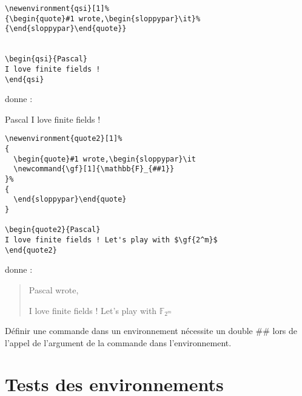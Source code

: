 \newenvironment{quote2}[1]%
{
  \begin{quote}#1 wrote,\begin{sloppypar}\it
  \newcommand{\gf}[1]{\mathbb{F}_{##1}}
}%
{
  \end{sloppypar}\end{quote}
}


\bigskip
\begin{verbatim}
\newenvironment{qsi}[1]%
{\begin{quote}#1 wrote,\begin{sloppypar}\it}%
{\end{sloppypar}\end{quote}}


\begin{qsi}{Pascal}
I love finite fields !
\end{qsi}
\end{verbatim}
donne :\\
\begin{qsi}{Pascal}
I love finite fields !
\end{qsi}




\begin{verbatim}
\newenvironment{quote2}[1]%
{
  \begin{quote}#1 wrote,\begin{sloppypar}\it
  \newcommand{\gf}[1]{\mathbb{F}_{##1}}
}%
{
  \end{sloppypar}\end{quote}
}

\begin{quote2}{Pascal}
I love finite fields ! Let's play with $\gf{2^m}$
\end{quote2}
\end{verbatim}
donne :\\
\begin{quote2}{Pascal}
I love finite fields ! Let's play with $\gf{2^m}$
\end{quote2}


Définir une commande dans un environnement nécessite un double \#\# lors de l'appel de l'argument de la commande dans l'environnement.

\section{Tests des environnements}

